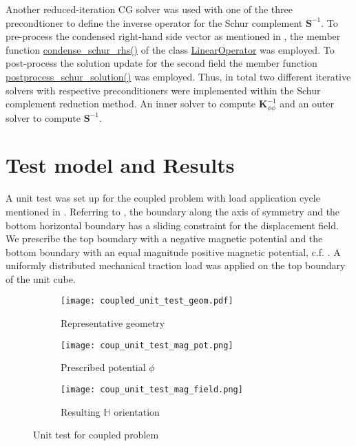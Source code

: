 Another reduced-iteration CG solver was used with one of the three precondtioner to define the inverse operator for the Schur complement $\mathbf{S}^{-1}$. To pre-process the condensed right-hand side vector as mentioned in , the member function \href{https://www.dealii.org/current/doxygen/deal.II/group__LAOperators.html#ga2c071b6555ac9e2eb543b7da5100889b}{condense\_schur_rhs()} of the class \href{https://www.dealii.org/current/doxygen/deal.II/classLinearOperator.html}{LinearOperator} was employed. To post-process the solution update for the second field the member function \href{https://www.dealii.org/current/doxygen/deal.II/group__LAOperators.html#gab965c40b54990bbcbc129a1cd218ee21}{postprocess\_schur_solution()} was employed. Thus, in total two different iterative solvers with respective preconditioners were implemented within the Schur complement reduction method. An inner solver to compute $\mathbf{K}_{\phi \phi}^{-1}$ and an outer solver to compute $\mathbf{S}^{-1}$.

\section{Test model and Results}
\label{sec:unit_test_coup}
A unit test was set up for the coupled problem with load application cycle mentioned in . Referring to , the boundary along the axis of symmetry and the bottom horizontal boundary has a sliding constraint for the displacement field. We prescribe the top boundary with a negative magnetic potential and the bottom boundary with an equal magnitude positive magnetic potential, c.f. . A uniformly distributed mechanical traction load was applied on the top boundary of the unit cube. \par 

\begin{figure}[h]
\centering
\begin{subfigure}{0.4\textwidth}
\centering
\texttt{[image: coupled\_unit\_test\_geom.pdf]}
\caption{Representative geometry}
\label{fig:3.8.1}
\end{subfigure}
\begin{subfigure}{0.28\textwidth}
\centering
\texttt{[image: coup\_unit\_test\_mag\_pot.png]}
\caption{Prescribed potential $\phi$}
\label{fig:3.8.2}
\end{subfigure}
\begin{subfigure}{0.28\textwidth}
\centering
\texttt{[image: coup\_unit\_test\_mag\_field.png]}
\caption{Resulting $\mathbb{H}$ orientation}
\label{fig:3.8.3}
\end{subfigure}
\caption{Unit test for coupled problem}
\label{fig:3.8}
\end{figure}

